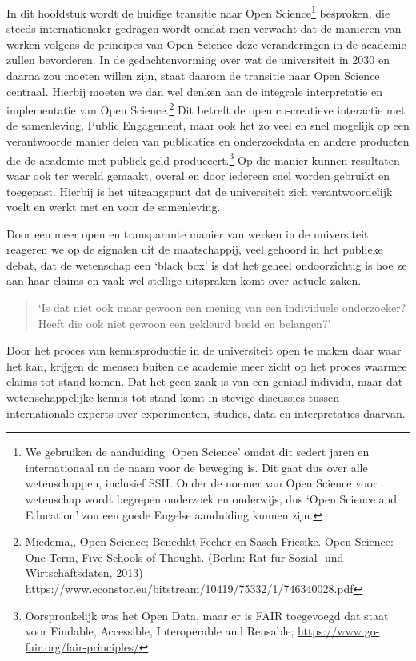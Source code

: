 \documentclass[empirical, authordate, ]{new-jote-article}
\begin{document}
	In dit hoofdstuk wordt de huidige transitie naar Open Science\footnote{We gebruiken de aanduiding ‘Open Science' omdat dit sedert jaren en internationaal nu de naam voor de beweging is. Dit gaat dus over alle wetenschappen, inclusief SSH. Onder de noemer van Open Science voor wetenschap wordt begrepen onderzoek en onderwijs, dus ‘Open Science and Education' zou een goede Engelse aanduiding kunnen zijn.} besproken, die steeds internationaler gedragen wordt omdat men verwacht dat de manieren van werken volgens de principes van Open Science deze veranderingen in de academie zullen bevorderen. In de gedachtenvorming over wat de universiteit in 2030 en daarna zou moeten willen zijn, staat daarom de transitie naar Open Science centraal. Hierbij moeten we dan wel denken aan de integrale interpretatie en implementatie van Open Science.\footnote{Miedema,, Open Science; Benedikt Fecher en Sasch Friesike. Open Science: One Term, Five Schools of Thought. (Berlin: Rat für Sozial- und Wirtschaftsdaten, 2013) https://www.econstor.eu/bitstream/10419/75332/1/746340028.pdf } Dit betreft de open co-creatieve interactie met de samenleving, Public Engagement, maar ook het zo veel en snel mogelijk op een verantwoorde manier delen van publicaties en onderzoekdata en andere producten die de academie met publiek geld produceert.\footnote{Oorspronkelijk was het Open Data, maar er is FAIR toegevoegd dat staat voor Findable, Accessible, Interoperable and Reusable; \href{https://www.go-fair.org/fair-principles/}{https://www.go-fair.org/fair-principles/}} Op die manier kunnen resultaten waar ook ter wereld gemaakt, overal en door iedereen snel worden gebruikt en toegepast. Hierbij is het uitgangspunt dat de universiteit zich verantwoordelijk voelt en werkt met en voor de samenleving.



	Door een meer open en transparante manier van werken in de universiteit reageren we op de signalen uit de maatschappij, veel gehoord in het publieke debat, dat de wetenschap een ‘black box' is dat het geheel ondoorzichtig is hoe ze aan haar claims en vaak wel stellige uitspraken komt over actuele zaken.

	\begin{quote}
		\itshape

		‘Is dat niet ook maar gewoon een mening van een individuele onderzoeker? Heeft die ook niet gewoon een gekleurd beeld en belangen?'
	\end{quote}

	Door het proces van kennisproductie in de universiteit open te maken daar waar het kan, krijgen de mensen buiten de academie meer zicht op het proces waarmee claims tot stand komen. Dat het geen zaak is van een geniaal individu, maar dat wetenschappelijke kennis tot stand komt in stevige discussies tussen internationale experts over experimenten, studies, data en interpretaties daarvan.
\end{document}
